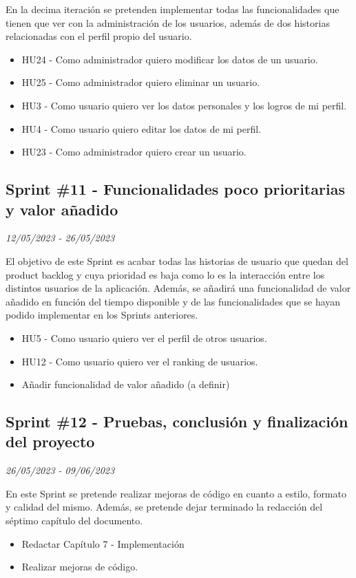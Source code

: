 En la decima iteración se pretenden implementar todas las funcionalidades que tienen que ver con la administración de los usuarios, además de
dos historias relacionadas con el perfil propio del usuario.
\begin{itemize}
    \item HU24 - Como administrador quiero modificar los datos de un usuario.
    \item HU25 - Como administrador quiero eliminar un usuario.
    \item HU3 - Como usuario quiero ver los datos personales y los logros de mi perfil.
    \item HU4 - Como usuario quiero editar los datos de mi perfil.
    \item HU23 - Como administrador quiero crear un usuario.

\end{itemize}

\subsection{Sprint \#11 - Funcionalidades poco prioritarias y valor añadido}
\textit{12/05/2023   -   26/05/2023}

El objetivo de este Sprint es acabar todas las historias de usuario que quedan del product backlog y cuya prioridad es baja como lo es la interacción entre los distintos usuarios de la aplicación. Además, se añadirá una funcionalidad de valor añadido
en función del tiempo disponible y de las funcionalidades que se hayan podido implementar en los Sprints anteriores.
\begin{itemize}
    \item HU5 - Como usuario quiero ver el perfil de otros usuarios.
    \item HU12 - Como usuario quiero ver el ranking de usuarios.
    \item Añadir funcionalidad de valor añadido (a definir)
\end{itemize}

\subsection{Sprint \#12 - Pruebas, conclusión y finalización del proyecto}
\textit{26/05/2023   -   09/06/2023}

En este Sprint se pretende realizar mejoras de código en cuanto a estilo, formato y calidad del mismo. Además, se pretende dejar terminado la redacción
del séptimo capítulo del documento.
\begin{itemize}
    \item Redactar Capítulo 7 - Implementación
    \item Realizar mejoras de código.
\end{itemize}


